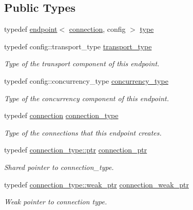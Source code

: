 \subsection*{Public Types}
\begin{DoxyCompactItemize}
\item 
typedef \hyperlink{classwebsocketpp_1_1endpoint}{endpoint}$<$ \hyperlink{classwebsocketpp_1_1connection}{connection}, config $>$ \hyperlink{classwebsocketpp_1_1endpoint_a3b2b343203819be45219dce781e8c55d}{type}
\item 
typedef config\+::transport\+\_\+type \hyperlink{classwebsocketpp_1_1endpoint_a8aa5190eb55c719559d2e6ea187a627b}{transport\+\_\+type}
\begin{DoxyCompactList}\small\item\em Type of the transport component of this endpoint. \end{DoxyCompactList}\item 
typedef config\+::concurrency\+\_\+type \hyperlink{classwebsocketpp_1_1endpoint_a16950dc8da6e73c4aeb47f7755b63101}{concurrency\+\_\+type}
\begin{DoxyCompactList}\small\item\em Type of the concurrency component of this endpoint. \end{DoxyCompactList}\item 
typedef \hyperlink{classwebsocketpp_1_1connection}{connection} \hyperlink{classwebsocketpp_1_1endpoint_a7f5908ada1bc82cb3b519e672bccdaa9}{connection\+\_\+type}
\begin{DoxyCompactList}\small\item\em Type of the connections that this endpoint creates. \end{DoxyCompactList}\item 
typedef \hyperlink{classwebsocketpp_1_1connection_ab910d42e3bde91546183cc54642f32ab}{connection\+\_\+type\+::ptr} \hyperlink{classwebsocketpp_1_1endpoint_aa90d289d870c500be228ee1dea75b8b2}{connection\+\_\+ptr}
\begin{DoxyCompactList}\small\item\em Shared pointer to connection\+\_\+type. \end{DoxyCompactList}\item 
typedef \hyperlink{classwebsocketpp_1_1connection_ac2905dcf6418c52ec9685f9f59b86e3e}{connection\+\_\+type\+::weak\+\_\+ptr} \hyperlink{classwebsocketpp_1_1endpoint_afc1de254d2c4cf68ef29aae7189edb26}{connection\+\_\+weak\+\_\+ptr}
\begin{DoxyCompactList}\small\item\em Weak pointer to connection type. \end{DoxyCompactList}\item 

\end{DoxyCompactItemize}
